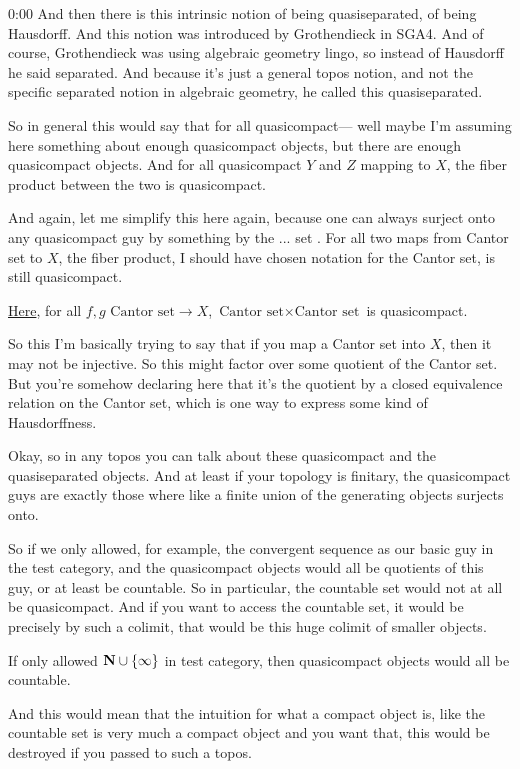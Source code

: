 \begin{unfinished}{0:00}
And then there is this intrinsic notion of being quasiseparated, of being Hausdorff. And this notion was introduced by Grothendieck in SGA4. And of course, Grothendieck was using algebraic geometry lingo, so instead of Hausdorff he said separated. And because it's just a general topos notion, and not the specific separated notion in algebraic geometry, he called this quasiseparated.

So in general this would say that for all quasicompact--- well maybe I'm assuming here something about enough quasicompact objects, but there are enough quasicompact objects. And for all quasicompact $Y$ and $Z$ mapping to $X$, the fiber product between the two is quasicompact.

And again, let me simplify this here again, because one can always surject onto any quasicompact guy by something by the ... set . For all two maps from Cantor set to $X$, the fiber product, I should have chosen notation for the Cantor set, is still quasicompact.

\underline{Here}, for all $f, g$ $\text{Cantor set} \to X$, $\text{Cantor set} \times \text{Cantor set}$ is quasicompact.

So this I'm basically trying to say that if you map a Cantor set into $X$, then it may not be injective. So this might factor over some quotient of the Cantor set. But you're somehow declaring here that it's the quotient by a closed equivalence relation on the Cantor set, which is one way to express some kind of Hausdorffness.

Okay, so in any topos you can talk about these quasicompact and the quasiseparated objects. And at least if your topology is finitary, the quasicompact guys are exactly those where like a finite union of the generating objects surjects onto.

So if we only allowed, for example, the convergent sequence as our basic guy in the test category, and the quasicompact objects would all be quotients of this guy, or at least be countable. So in particular, the countable set would not at all be quasicompact. And if you want to access the countable set, it would be precisely by such a colimit, that would be this huge colimit of smaller objects.

If only allowed $\mathbf N \cup \{\infty\}$ in test category, then quasicompact objects would all be countable.

And this would mean that the intuition for what a compact object is, like the countable set is very much a compact object and you want that, this would be destroyed if you passed to such a topos.


\end{unfinished}
